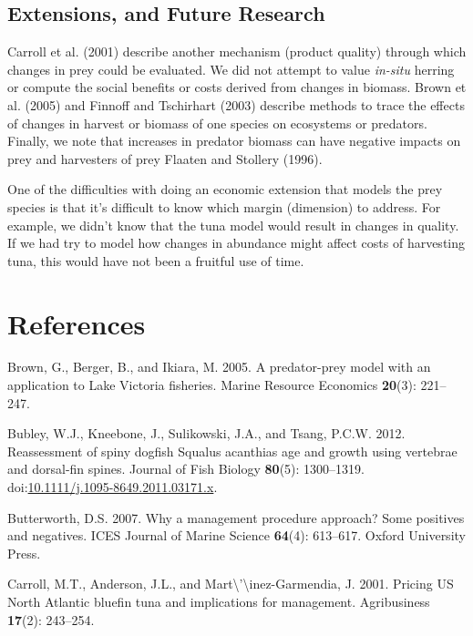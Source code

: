 \documentclass[]{article}
\begin{document}
\subsection{Extensions, and Future
Research}\label{extensions-and-future-research}

Carroll et al. (2001) describe another mechanism (product quality)
through which changes in prey could be evaluated. We did not attempt to
value \emph{in-situ} herring or compute the social benefits or costs
derived from changes in biomass. Brown et al. (2005) and Finnoff and
Tschirhart (2003) describe methods to trace the effects of changes in
harvest or biomass of one species on ecosystems or predators. Finally,
we note that increases in predator biomass can have negative impacts on
prey and harvesters of prey Flaaten and Stollery (1996).

One of the difficulties with doing an economic extension that models the
prey species is that it's difficult to know which margin (dimension) to
address. For example, we didn't know that the tuna model would result in
changes in quality. If we had try to model how changes in abundance
might affect costs of harvesting tuna, this would have not been a
fruitful use of time. \clearpage

\section*{References}\label{references}

\hypertarget{refs}{}
\hypertarget{ref-Brown2005AFisheries}{}
Brown, G., Berger, B., and Ikiara, M. 2005. A predator-prey model with
an application to Lake Victoria fisheries. Marine Resource Economics
\textbf{20}(3): 221--247.

\hypertarget{ref-bubley_reassessment_2012}{}
Bubley, W.J., Kneebone, J., Sulikowski, J.A., and Tsang, P.C.W. 2012.
Reassessment of spiny dogfish Squalus acanthias age and growth using
vertebrae and dorsal-fin spines. Journal of Fish Biology \textbf{80}(5):
1300--1319.
doi:\href{https://doi.org/10.1111/j.1095-8649.2011.03171.x}{10.1111/j.1095-8649.2011.03171.x}.

\hypertarget{ref-butterworth2007management}{}
Butterworth, D.S. 2007. Why a management procedure approach? Some
positives and negatives. ICES Journal of Marine Science \textbf{64}(4):
613--617. Oxford University Press.

\hypertarget{ref-Carroll2001PricingManagement}{}
Carroll, M.T., Anderson, J.L., and
Mart\textbackslash{}'\textbackslash{}inez-Garmendia, J. 2001. Pricing US
North Atlantic bluefin tuna and implications for management.
Agribusiness \textbf{17}(2): 243--254.
\end{document}
